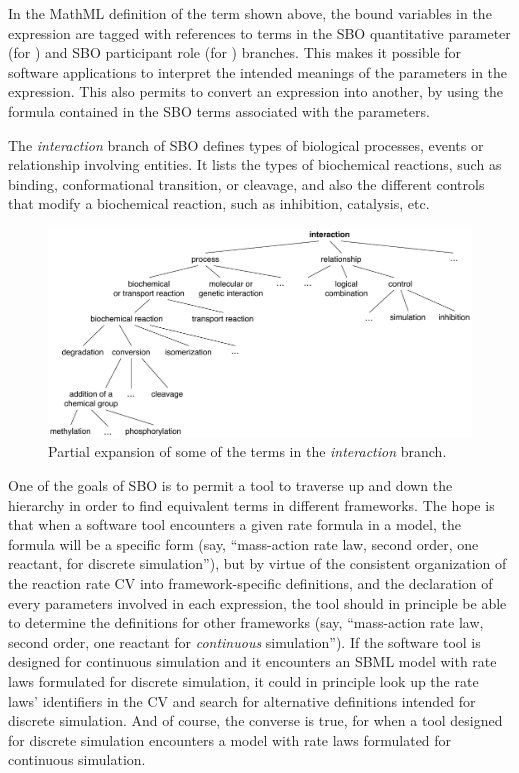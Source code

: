 In the MathML definition of the term shown above, the bound
variables in the  expression are tagged with
references to terms in the SBO quantitative parameter (for
) and SBO participant role (for ) branches.
This makes it possible for software applications to interpret the
intended meanings of the parameters in the expression.  This also
permits to convert an expression into another, by using the
\mathmltwo formula contained in the SBO terms associated with the
parameters.

The \emph{interaction} branch of SBO defines types of biological
processes, events or relationship involving entities.  It lists
the types of biochemical reactions, such as binding,
conformational transition, or cleavage, and also the different
controls that modify a biochemical reaction, such as inhibition,
catalysis, etc.

\begin{figure}[tbh]
  \centering
  \includegraphics[scale = 0.8]{figs/sbo-interaction}
  \caption{Partial expansion of some of the terms in the \emph{interaction} branch.}
  \label{fig:sbo-interaction}
\end{figure}

One of the goals of SBO is to permit a tool to traverse up and
down the hierarchy in order to find equivalent terms in different
frameworks.  The hope is that when a software tool encounters a
given rate formula in a model, the formula will be a specific form
(say, ``mass-action rate law, second order, one reactant, for
discrete simulation''), but by virtue of the consistent
organization of the reaction rate CV into framework-specific
definitions, and the declaration of every parameters involved in
each expression, the tool should in principle be able to determine
the definitions for other frameworks (say, ``mass-action rate law,
second order, one reactant for \emph{continuous} simulation'').
If the software tool is designed for continuous simulation and it
encounters an SBML model with rate laws formulated for discrete
simulation, it could in principle look up the rate laws'
identifiers in the CV and search for alternative definitions
intended for discrete simulation.  And of course, the converse is
true, for when a tool designed for discrete simulation encounters
a model with rate laws formulated for continuous simulation.


